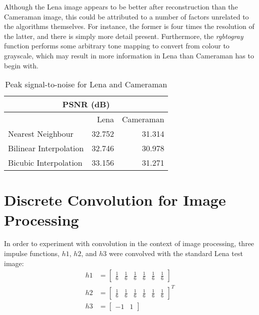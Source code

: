 \documentclass{sydeStyle}
\begin{document}
Although the Lena image appears to be better after reconstruction than the Cameraman image, this could be attributed to a number of factors unrelated to the algorithms themselves.
For instance, the former is four times the resolution of the latter, and there is simply more detail present.
Furthermore, the \emph{rgbtogray} function performs some arbitrary tone mapping to convert from colour to grayscale, which may result in more information in Lena than Cameraman has to begin with.

\begin{table}
	\centering
	\begin{tabular}{| l | r | r |}
		\hline
		\multicolumn{3}{|c|}{PSNR (dB)} \\ \hline
		& Lena & Cameraman \\ \hline
		Nearest Neighbour & 32.752 & 31.314 \\ \hline
		Bilinear Interpolation & 32.746 & 30.978 \\ \hline
		Bicubic Interpolation & 33.156 & 31.271 \\
		\hline
	\end{tabular}
	\caption{Peak signal-to-noise for Lena and Cameraman}
	\label{tab:psnr}
\end{table}

\section*{Discrete Convolution for Image Processing}
In order to experiment with convolution in the context of image processing,
three impulse functions, $h1$, $h2$, and $h3$ were convolved with the standard
Lena test image:
\begin{align*}
	h1 & = \begin{bmatrix}\frac{1}{6} & \frac{1}{6} & \frac{1}{6} & \frac{1}{6}
		& \frac{1}{6} & \frac{1}{6}\end{bmatrix} \\
	h2 & = \begin{bmatrix}\frac{1}{6} & \frac{1}{6} & \frac{1}{6} & \frac{1}{6}
		& \frac{1}{6} & \frac{1}{6}\end{bmatrix}^T \\
	h3 & = \begin{bmatrix}-1 & 1\end{bmatrix}
\end{align*}
\end{document}
